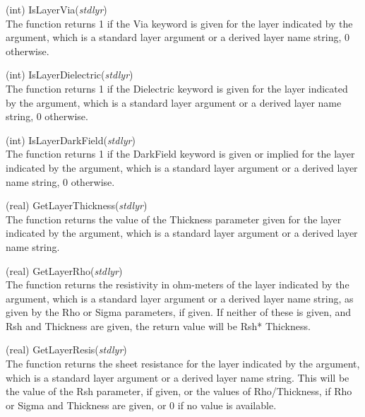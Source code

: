 \begin{description}
\item{(int) \vt IsLayerVia({\it stdlyr\/})}\\
The function returns 1 if the {\et Via} keyword is given for the layer
indicated by the argument, which is a standard layer argument or a
derived layer name string, 0 otherwise.

\item{(int) \vt IsLayerDielectric({\it stdlyr\/})}\\
The function returns 1 if the {\et Dielectric} keyword is given for
the layer indicated by the argument, which is a standard layer
argument or a derived layer name string, 0 otherwise.

\item{(int) \vt IsLayerDarkField({\it stdlyr\/})}\\
The function returns 1 if the {\et DarkField} keyword is given or
implied for the layer indicated by the argument, which is a standard
layer argument or a derived layer name string, 0 otherwise.

\item{(real) \vt GetLayerThickness({\it stdlyr\/})}\\
The function returns the value of the {\et Thickness} parameter given
for the layer indicated by the argument, which is a standard layer
argument or a derived layer name string.

\item{(real) \vt GetLayerRho({\it stdlyr\/})}\\
The function returns the resistivity in ohm-meters of the layer
indicated by the argument, which is a standard layer argument or a
derived layer name string, as given by the {\vt Rho} or {\vt Sigma}
parameters, if given.  If neither of these is given, and {\vt Rsh} and
{\vt Thickness} are given, the return value will be {\vt Rsh}*{\vt
Thickness}.

\item{(real) \vt GetLayerResis({\it stdlyr\/})}\\
The function returns the sheet resistance for the layer indicated
by the argument, which is a standard layer argument or a derived layer
name string.  This will be the value of the {\vt Rsh} parameter, if
given, or the values of {\vt Rho}/{\vt Thickness}, if {\vt Rho} or
{\vt Sigma} and {\vt Thickness} are given, or 0 if no value is
available.


\end{description}
